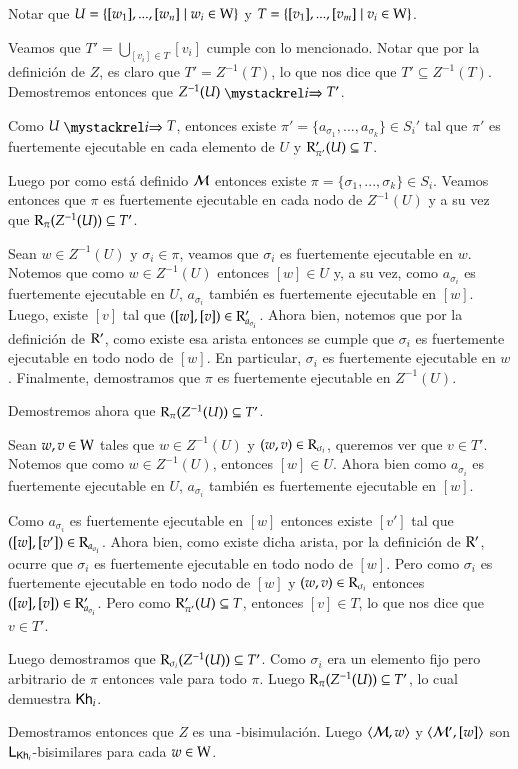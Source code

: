 \begin{demostracion}
\begin{itemize}
        Notar que $U = \{[w_1],...,[w_n]\mid w_i \in \mathrm{W} \}$ y $T = \{[v_1],...,[v_m]\mid v_i \in \mathrm{W} \}$.
        
        Veamos que $T' = \bigcup\limits_{[v_i] \in T} [v_i]$ cumple con lo mencionado. Notar que por la definición de $Z$, es claro que $T' = Z^{-1}(T)$, lo que nos dice que $T' \subseteq Z^{-1}(T)$. Demostremos entonces que $Z^{-1}(U) \ultsExecAgi T'$. 
    
        Como $U \ultsExecAgi T$, entonces existe $\pi' = \{a_{\sigma_1},...,a_{\sigma_k}\}\in S_i'$ tal que $\pi'$ es fuertemente ejecutable en cada elemento de $U$ y $\mathrm{R}'_{\pi'}(U) \subseteq T$.

        Luego por como está definido $\mathcal{M}$ entonces existe $\pi = \{\sigma_1,...,\sigma_k\} \in S_i$. Veamos entonces que $\pi$ es fuertemente ejecutable en cada nodo de $Z^{-1}(U)$ y a su vez que $\mathrm{R}_\pi(Z^{-1}(U)) \subseteq T'$.

        Sean $w \in Z^{-1}(U)$ y $\sigma_i \in \pi$, veamos que $\sigma_i$ es fuertemente ejecutable en $w$. Notemos que como $w \in Z^{-1}(U)$ entonces $[w] \in U$ y, a su vez, como $a_{\sigma_i}$ es fuertemente ejecutable en $U$, $a_{\sigma_i}$ también es fuertemente ejecutable en $[w]$. Luego, existe $[v]$ tal que $([w],[v]) \in \mathrm{R}'_{a_{\sigma_i}}$. Ahora bien, notemos que por la definición de $\mathrm{R}'$, como existe esa arista entonces se cumple que $\sigma_i$ es fuertemente ejecutable en todo nodo de $[w]$. En particular, $\sigma_i$ es fuertemente ejecutable en $w$. Finalmente, demostramos que $\pi$ es fuertemente ejecutable en $Z^{-1}(U)$.

        Demostremos ahora que $\mathrm{R}_{\pi}(Z^{-1}(U)) \subseteq T'$. 

        Sean $w, v \in \mathrm{W}$ tales que $w \in Z^{-1}(U)$ y $(w,v) \in \mathrm{R}_{\sigma_i}$, queremos ver que $v \in T'$. Notemos que como $w \in Z^{-1}(U)$, entonces $[w] \in U$. Ahora bien como $a_{\sigma_i}$ es fuertemente ejecutable en $U$, $a_{\sigma_i}$ también es fuertemente ejecutable en $[w]$.
        
        Como $a_{\sigma_i}$ es fuertemente ejecutable en $[w]$ entonces existe $[v']$ tal que $([w],[v']) \in \mathrm{R}_{a_{\sigma_i}}$. Ahora bien, como existe dicha arista, por la definición de $\mathrm{R}'$, ocurre que $\sigma_i$ es fuertemente ejecutable en todo nodo de $[w]$. Pero como $\sigma_i$ es fuertemente ejecutable en todo nodo de $[w]$ y $(w,v) \in \mathrm{R}_{\sigma_i}$ entonces $([w],[v]) \in \mathrm{R}'_{a_{\sigma_i}}$. Pero como $\mathrm{R}'_{\pi'}(U) \subseteq T$, entonces $[v] \in T$, lo que nos dice que $v \in T'$.
        
        Luego demostramos que $\mathrm{R}_{\sigma_i}(Z^{-1}(U)) \subseteq T'$. Como $\sigma_i$ era un elemento fijo pero arbitrario de $\pi$ entonces vale para todo $\pi$. Luego $\mathrm{R}_\pi(Z^{-1}(U)) \subseteq T'$, lo cual demuestra $\mathsf{Kh}_i$.
    \end{itemize}

    Demostramos entonces que $Z$ es una \KHilogic-bisimulación. Luego $\langle \mathcal{M},w \rangle$ y $\langle \mathcal{M}',[w] \rangle$ son $\mathsf{L}_{\mathsf{Kh}_i}$-bisimilares para cada $w \in \mathrm{W}$.
    
\end{demostracion}



